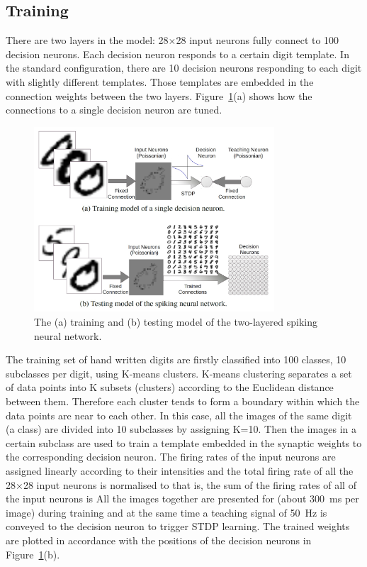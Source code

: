 \subsection{Training}
There are two layers in the model: 28$\times$28 input neurons fully connect to 100 decision neurons.
Each decision neuron responds to a certain digit template.
In the standard configuration, there are 10 decision neurons responding to each digit with slightly different templates.
Those templates are embedded in the connection weights between the two layers.
Figure~\ref{fig:model}(a) shows how the connections to a single decision neuron are tuned.

\begin{figure}[thb!]
	\centering
	\includegraphics[width=0.8\textwidth]{pics_bench/fig6.jpg}
	\caption{The (a) training and (b) testing model of the two-layered spiking neural network.}
	\label{fig:model}
\end{figure} 

The training set of \protect{} \protect{} hand written digits are firstly classified into 100 classes, 10 subclasses per digit, using K-means clusters.
K-means clustering separates a set of data points into K subsets (clusters) according to the Euclidean distance between them.
Therefore each cluster tends to form a boundary within which the data points are near to each other.
In this case, all the images of the same digit (a class) are divided into 10 subclasses by assigning K=10.
Then the images in a certain subclass are used to train a template embedded in the synaptic weights to the corresponding decision neuron.
The firing rates of the input neurons are assigned linearly according to their intensities and the total firing rate of all the 28$\times$28 input neurons is normalised to \protect{} \protect{} that is, the sum of the firing rates of all of the input neurons is \protect{} \protect{}
All the images together are presented for \protect{} \protect{} (about 300~ms per image) during training and at the same time a teaching signal of 50~Hz is conveyed to the decision neuron to trigger STDP learning.
The trained weights are plotted in accordance with the positions of the decision neurons in Figure~\ref{fig:model}(b).





